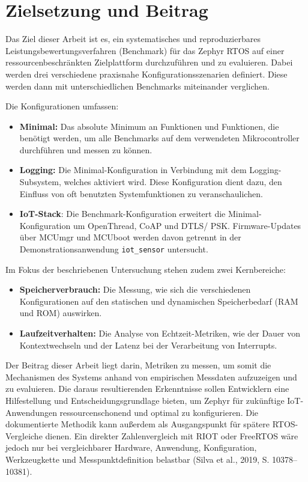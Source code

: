 \section{Zielsetzung und Beitrag}
Das Ziel dieser Arbeit ist es, ein systematisches und reproduzierbares Leistungsbewertungsverfahren (Benchmark) f{\"u}r das Zephyr RTOS auf einer ressourcenbeschr{\"a}nkten Zielplattform durchzuf{\"u}hren und zu evaluieren. Dabei werden drei verschiedene praxisnahe Konfigurationsszenarien definiert. Diese werden dann mit unterschiedlichen Benchmarks miteinander verglichen.

Die Konfigurationen umfassen:

\begin{itemize}
\item \textbf{Minimal: }Das absolute Minimum an Funktionen und Funktionen, die ben{\"o}tigt werden, um alle Benchmarks auf dem verwendeten Mikrocontroller durchf{\"u}hren und messen zu k{\"o}nnen.
\item \textbf{Logging: }Die Minimal-Konfiguration in Verbindung mit dem Logging-Subsystem, welches aktiviert wird. Diese Konfiguration dient dazu, den Einfluss von oft benutzten Systemfunktionen zu veranschaulichen.
\item \textbf{IoT-Stack}: Die Benchmark-Konfiguration erweitert die Minimal-Konfiguration um OpenThread, CoAP und DTLS/ PSK. Firmware-Updates {\"u}ber MCUmgr und MCUboot werden davon getrennt in der Demonstrationsanwendung \lstinline[style=codeinline]|iot_sensor| untersucht.
\end{itemize}
Im Fokus der beschriebenen Untersuchung stehen zudem zwei Kernbereiche:

\begin{itemize}
\item \textbf{Speicherverbrauch:} Die Messung, wie sich die verschiedenen Konfigurationen auf den statischen und dynamischen Speicherbedarf (RAM und ROM) auswirken.
\item \textbf{Laufzeitverhalten:} Die Analyse von Echtzeit-Metriken, wie der Dauer von Kontextwechseln und der Latenz bei der Verarbeitung von Interrupts.
\end{itemize}
Der Beitrag dieser Arbeit liegt darin, Metriken zu messen, um somit die Mechanismen des Systems anhand von empirischen Messdaten aufzuzeigen und zu evaluieren. Die daraus resultierenden Erkenntnisse sollen Entwicklern eine Hilfestellung und Entscheidungsgrundlage bieten, um Zephyr f{\"u}r zuk{\"u}nftige IoT-Anwendungen ressourcenschonend und optimal zu konfigurieren. Die dokumentierte Methodik kann au{\ss}erdem als Ausgangspunkt f{\"u}r sp{\"a}tere RTOS-Vergleiche dienen. Ein direkter Zahlenvergleich mit RIOT oder FreeRTOS w{\"a}re jedoch nur bei vergleichbarer Hardware, Anwendung, Konfiguration, Werkzeugkette und Messpunktdefinition belastbar (Silva et al., 2019, S. 10378--10381).


